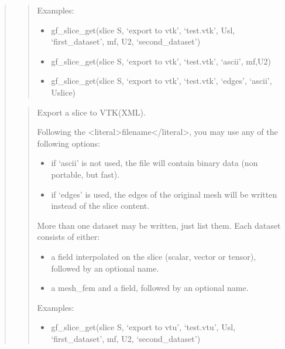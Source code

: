 \documentclass[a4paper,11pt,english]{sphinxmanual}
\begin{document}
\begin{quote}
\begin{quote}
\begin{itemize}
\end{itemize}

\sphinxAtStartPar
Examples:
\begin{itemize}
\item {} 
\sphinxAtStartPar
gf\_slice\_get(slice S, ‘export to vtk’, ‘test.vtk’, Usl, ‘first\_dataset’, mf,
U2, ‘second\_dataset’)

\item {} 
\sphinxAtStartPar
gf\_slice\_get(slice S, ‘export to vtk’, ‘test.vtk’, ‘ascii’, mf,U2)

\item {} 
\sphinxAtStartPar
gf\_slice\_get(slice S, ‘export to vtk’, ‘test.vtk’, ‘edges’, ‘ascii’, Uslice)

\end{itemize}
\end{quote}

\sphinxAtStartPar
{}
\begin{quote}

\sphinxAtStartPar
Export a slice to VTK(XML).

\sphinxAtStartPar
Following the \textless{}literal\textgreater{}filename\textless{}/literal\textgreater{}, you may use any of the following options:
\begin{itemize}
\item {} 
\sphinxAtStartPar
if ‘ascii’ is not used, the file will contain binary data
(non portable, but fast).

\item {} 
\sphinxAtStartPar
if ‘edges’ is used, the edges of the original mesh will be
written instead of the slice content.

\end{itemize}

\sphinxAtStartPar
More than one dataset may be written, just list them. Each dataset
consists of either:
\begin{itemize}
\item {} 
\sphinxAtStartPar
a field interpolated on the slice (scalar, vector or tensor),
followed by an optional name.

\item {} 
\sphinxAtStartPar
a mesh\_fem and a field, followed by an optional name.

\end{itemize}

\sphinxAtStartPar
Examples:
\begin{itemize}
\item {} 
\sphinxAtStartPar
gf\_slice\_get(slice S, ‘export to vtu’, ‘test.vtu’, Usl, ‘first\_dataset’, mf,
U2, ‘second\_dataset’)


\end{itemize}
\end{quote}
\end{quote}
\end{document}
